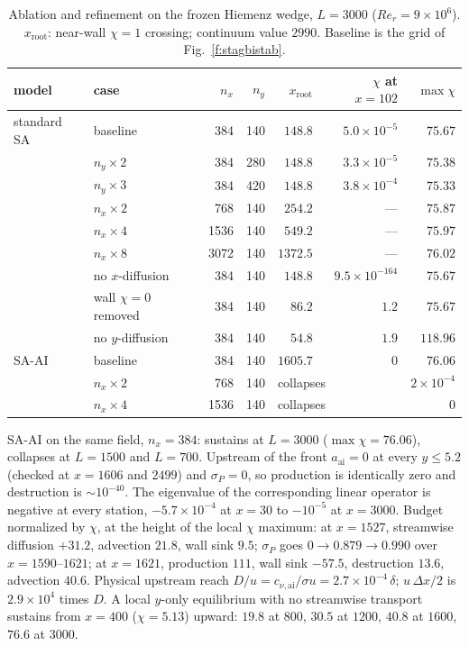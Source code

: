\documentclass[10pt]{article}
\begin{document}
\begin{table}[H]
  \centering\small
  \caption{Ablation and refinement on the frozen Hiemenz wedge, $L=3000$
  ($Re_r=9\times10^6$). $x_\mathrm{root}$: near-wall $\chi=1$ crossing;
  continuum value $2990$. Baseline is the grid of
  Fig.~\ref{f:stagbistab}.}
  \label{t:stagablate}
  \begin{tabular}{llrrrrr}
    \toprule
    model & case & $n_x$ & $n_y$ & $x_\mathrm{root}$
      & $\chi$ at $x=102$ & $\max\chi$ \\
    \midrule
    standard SA & baseline               &  384 & 140 & $148.8$ & $5.0\times10^{-5}$ & $75.67$ \\
                & $n_y\!\times\!2$       &  384 & 280 & $148.8$ & $3.3\times10^{-5}$ & $75.38$ \\
                & $n_y\!\times\!3$       &  384 & 420 & $148.8$ & $3.8\times10^{-4}$ & $75.33$ \\
                & $n_x\!\times\!2$       &  768 & 140 & $254.2$ & --- & $75.87$ \\
                & $n_x\!\times\!4$       & 1536 & 140 & $549.2$ & --- & $75.97$ \\
                & $n_x\!\times\!8$       & 3072 & 140 & $1372.5$ & --- & $76.02$ \\
                & no $x$-diffusion       &  384 & 140 & $148.8$ & $9.5\times10^{-164}$ & $75.67$ \\
                & wall $\chi=0$ removed  &  384 & 140 & $86.2$ & $1.2$ & $75.67$ \\
                & no $y$-diffusion       &  384 & 140 & $54.8$ & $1.9$ & $118.96$ \\
    \midrule
    SA-AI       & baseline               &  384 & 140 & $1605.7$ & $0$ & $76.06$ \\
                & $n_x\!\times\!2$       &  768 & 140 & \multicolumn{2}{l}{collapses} & $2\times10^{-4}$ \\
                & $n_x\!\times\!4$       & 1536 & 140 & \multicolumn{2}{l}{collapses} & $0$ \\
    \bottomrule
  \end{tabular}
\end{table}

SA-AI on the same field, $n_x=384$: sustains at $L=3000$
($\max\chi=76.06$), collapses at $L=1500$ and $L=700$. Upstream of the front
$a_\mathrm{ai}=0$ at every $y\le5.2$ (checked at $x=1606$ and $2499$) and
$\sigma_P=0$, so production is identically zero and destruction is
${\sim}10^{-40}$. The eigenvalue of the corresponding linear operator is
negative at every station, $-5.7\times10^{-4}$ at $x=30$ to $-10^{-5}$ at
$x=3000$. Budget normalized by $\chi$, at the height of the local $\chi$
maximum: at $x=1527$, streamwise diffusion $+31.2$, advection $21.8$, wall
sink $9.5$; $\sigma_P$ goes $0\to0.879\to0.990$ over $x=1590$--$1621$; at
$x=1621$, production $111$, wall sink $-57.5$, destruction $13.6$, advection
$40.6$. Physical upstream reach $D/u=c_{\nu,\mathrm{ai}}/\sigma u
=2.7\times10^{-4}\,\delta$; $u\,\Delta x/2$ is $2.9\times10^{4}$ times $D$.
A local $y$-only equilibrium with no streamwise transport sustains from
$x=400$ ($\chi=5.13$) upward: $19.8$ at $800$, $30.5$ at $1200$, $40.8$ at
$1600$, $76.6$ at $3000$.
\end{document}
